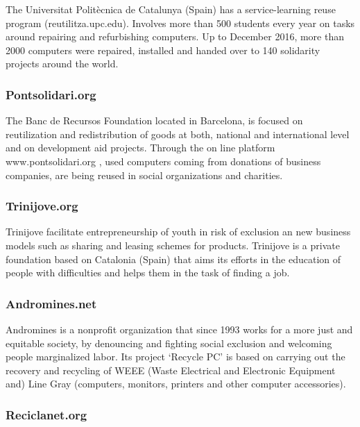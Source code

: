 \documentclass[
]{book}
\begin{document}
The Universitat Politècnica de Catalunya (Spain) has a service-learning reuse program (reutilitza.upc.edu). Involves more than 500 students every year on tasks around repairing and refurbishing computers. Up to December 2016, more than 2000 computers were repaired, installed and handed over to 140 solidarity projects around the world.

\hypertarget{pontsolidari.org}{%
\subsubsection{Pontsolidari.org}\label{pontsolidari.org}}

The Banc de Recursos Foundation located in Barcelona, is focused on reutilization and redistribution of goods at both, national and international level and on development aid projects. Through the on line platform www.pontsolidari.org , used computers coming from donations of business companies, are being reused in social organizations and charities.

\hypertarget{trinijove.org}{%
\subsubsection{Trinijove.org}\label{trinijove.org}}

Trinijove facilitate entrepreneurship of youth in risk of exclusion an new business models such as sharing and leasing schemes for products. Trinijove is a private foundation based on Catalonia (Spain) that aims its efforts in the education of people with difficulties and helps them in the task of finding a job.

\hypertarget{andromines.net}{%
\subsubsection{Andromines.net}\label{andromines.net}}

Andromines is a nonprofit organization that since 1993 works for a more just and equitable society, by denouncing and fighting social exclusion and welcoming people marginalized labor. Its project `Recycle PC' is based on carrying out the recovery and recycling of WEEE (Waste Electrical and Electronic Equipment and) Line Gray (computers, monitors, printers and other computer accessories).

\hypertarget{reciclanet.org}{%
\subsubsection{Reciclanet.org}\label{reciclanet.org}}
\end{document}
